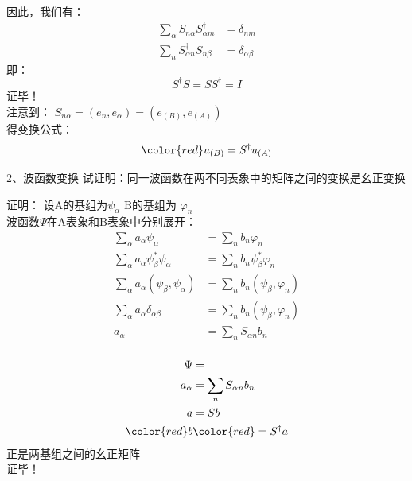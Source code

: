 \begin{frame} 
    因此，我们有：
    \begin{equation*}
        \begin{split}
            \sum_{\alpha} S_{n\alpha}   S^{\dagger } _{\alpha m} &=\delta_{nm} \\
            \sum_{n} S^{\dagger } _{\alpha n} S_{n\beta}&=\delta_{\alpha\beta}
        \end{split} 
    \end{equation*}
    即：$$ S^{\dagger }S=SS^{\dagger } =I$$ 
    证毕！ \\

    注意到： $ S_{n\alpha} = (e_n, e_\alpha)= (e_{(B)}, e_{(A)})$ \\
    得变换公式： $$ \color{red} u_{(B)}= S^{\dagger} u_ {(A)}$$
\end{frame}


\begin{frame} 
    \begin{tcolorbox1}{2、波函数变换}
        试证明：同一波函数在两不同表象中的矩阵之间的变换是幺正变换  
    \end{tcolorbox1}
    \alert{证明：} 设A的基组为$\psi_\alpha$ B的基组为 $\varphi_n$\\
    波函数$\Psi$在A表象和B表象中分别展开：
    \begin{equation*}
        \begin{split}
            \sum_\alpha a_\alpha \psi_\alpha &= \sum_n b_n \varphi_n \\
            \sum_\alpha a_\alpha \psi_\beta ^* \psi_\alpha &= \sum_n b_n \psi_\beta ^* \varphi_n \\
            \sum_\alpha a_\alpha (\psi_\beta, \psi_\alpha) &= \sum_n b_n (\psi_\beta, \varphi_n) \\
            \sum_\alpha a_\alpha \delta_{\alpha\beta} &= \sum_n b_n (\psi_\beta, \varphi_n) \\
            a_\alpha &= \sum_n S_{\alpha n} b_n\\
        \end{split} 
    \end{equation*}
\end{frame}

\begin{frame} 
    \begin{equation*}
        \begin{split}
            \Psi &= \\
            a_\alpha &= \sum_n S_{\alpha n} b_n\\
            a&=Sb\\
            \color{red} b& \color{red}=S^{\dagger}a   
        \end{split} 
    \end{equation*}
    正是两基组之间的幺正矩阵\\
    证毕！\\
\end{frame}



